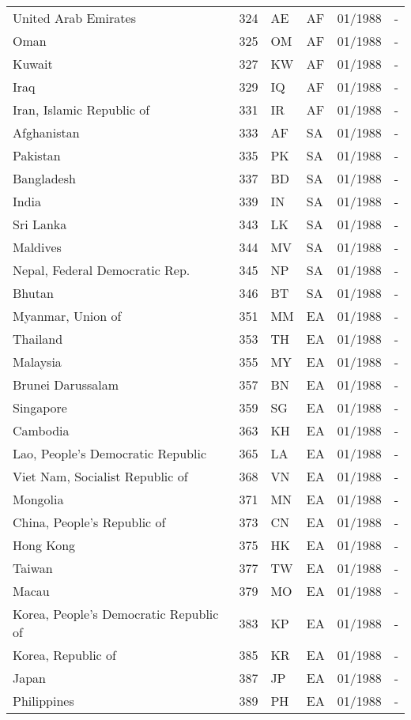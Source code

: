 \begin{small}
\begin{longtable}{p{4.3cm}p{1.5cm}p{1.5cm}p{1cm}p{2cm}p{2cm}}
United Arab Emirates	&	324	&	AE	&	AF	&	01/1988	&	-	\\
Oman	&	325	&	OM	&	AF	&	01/1988	&	-	\\
Kuwait	&	327	&	KW	&	AF	&	01/1988	&	-	\\
Iraq	&	329	&	IQ	&	AF	&	01/1988	&	-	\\
Iran, Islamic Republic of	&	331	&	IR	&	AF	&	01/1988	&	-	\\
Afghanistan	&	333	&	AF	&	SA	&	01/1988	&	-	\\
Pakistan	&	335	&	PK	&	SA	&	01/1988	&	-	\\
Bangladesh	&	337	&	BD	&	SA	&	01/1988	&	-	\\
India	&	339	&	IN	&	SA	&	01/1988	&	-	\\
Sri Lanka	&	343	&	LK	&	SA	&	01/1988	&	-	\\
Maldives	&	344	&	MV	&	SA	&	01/1988	&	-	\\
Nepal, Federal Democratic Rep.	&	345	&	NP	&	SA	&	01/1988	&	-	\\
Bhutan	&	346	&	BT	&	SA	&	01/1988	&	-	\\
Myanmar, Union of	&	351	&	MM	&	EA	&	01/1988	&	-	\\
Thailand	&	353	&	TH	&	EA	&	01/1988	&	-	\\
Malaysia	&	355	&	MY	&	EA	&	01/1988	&	-	\\
Brunei Darussalam	&	357	&	BN	&	EA	&	01/1988	&	-	\\
Singapore	&	359	&	SG	&	EA	&	01/1988	&	-	\\
Cambodia	&	363	&	KH	&	EA	&	01/1988	&	-	\\
Lao, People's Democratic Republic	&	365	&	LA	&	EA	&	01/1988	&	-	\\
Viet Nam, Socialist Republic of	&	368	&	VN	&	EA	&	01/1988	&	-	\\
Mongolia	&	371	&	MN	&	EA	&	01/1988	&	-	\\
China, People's Republic of	&	373	&	CN	&	EA	&	01/1988	&	-	\\
Hong Kong	&	375	&	HK	&	EA	&	01/1988	&	-	\\
Taiwan	&	377	&	TW	&	EA	&	01/1988	&	-	\\
Macau	&	379	&	MO	&	EA	&	01/1988	&	-	\\
Korea, People's Democratic Republic of	&	383	&	KP	&	EA	&	01/1988	&	-	\\
Korea, Republic of	&	385	&	KR	&	EA	&	01/1988	&	-	\\
Japan	&	387	&	JP	&	EA	&	01/1988	&	-	\\
Philippines	&	389	&	PH	&	EA	&	01/1988	&	-	\\

\end{longtable}
\end{small}
